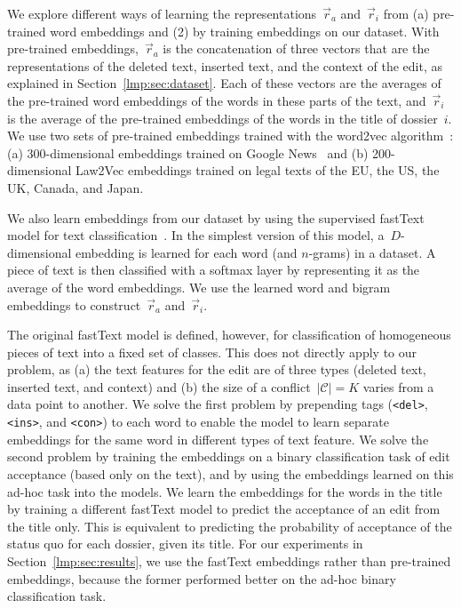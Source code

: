 We explore different ways of learning the representations~$\vec{r}_a$ and~$\vec{r}_i$ from (a) pre-trained word embeddings and (2) by training embeddings on our dataset.
With pre-trained embeddings,~$\vec{r}_a$ is the concatenation of three vectors that are the representations of the deleted text, inserted text, and the context of the edit, as explained in Section~\ref{lmp:sec:dataset}.
Each of these vectors are the averages of the pre-trained word embeddings of the words in these parts of the text, and~$\vec{r}_i$ is the average of the pre-trained embeddings of the words in the title of dossier~$i$.
We use two sets of pre-trained embeddings trained with the word2vec algorithm~\cite{mikolov2013distributed}: (a) 300-dimensional embeddings trained on Google News~\cite{google2013word2vec} and (b) 200-dimensional Law2Vec embeddings trained on legal texts of the EU, the US, the UK, Canada, and Japan\cite{chalkidis2019deep}.

We also learn embeddings from our dataset by using the supervised fastText model for text classification~\cite{joulin2017bag}.
In the simplest version of this model, a~$D$-dimensional embedding is learned for each word (and $n$-grams) in a dataset.
A piece of text is then classified with a softmax layer by representing it as the average of the word embeddings.
We use the learned word and bigram embeddings to construct~$\vec{r}_a$ and~$\vec{r}_i$.

The original fastText model is defined, however, for classification of homogeneous pieces of text into a fixed set of classes.
This does not directly apply to our problem, as (a) the text features for the edit are of three types (deleted text, inserted text, and context) and (b) the size of a conflict~$\vert \mathcal{C} \vert = K$ varies from a data point to another.
We solve the first problem by prepending tags (\texttt{<del>}, \texttt{<ins>}, and \texttt{<con>}) to each word to enable the model to learn separate embeddings for the same word in different types of text feature.
We solve the second problem by training the embeddings on a binary classification task of edit acceptance (based only on the text), and by using the embeddings learned on this ad-hoc task into the \wow{} models.
We learn the embeddings for the words in the title by training a different fastText model to predict the acceptance of an edit from the title only.
This is equivalent to predicting the probability of acceptance of the status quo for each dossier, given its title.
For our experiments in Section~\ref{lmp:sec:results}, we use the fastText embeddings rather than pre-trained embeddings, because the former performed better on the ad-hoc binary classification task.

